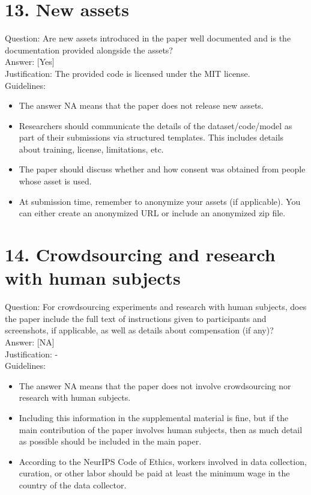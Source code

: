 \documentclass[10pt]{article}
\begin{document}
\section*{13. New assets}
Question: Are new assets introduced in the paper well documented and is the documentation provided alongside the assets?\\[0pt]
Answer: [Yes]\\
Justification: The provided code is licensed under the MIT license.\\
Guidelines:

\begin{itemize}
  \item The answer NA means that the paper does not release new assets.
  \item Researchers should communicate the details of the dataset/code/model as part of their submissions via structured templates. This includes details about training, license, limitations, etc.
  \item The paper should discuss whether and how consent was obtained from people whose asset is used.
  \item At submission time, remember to anonymize your assets (if applicable). You can either create an anonymized URL or include an anonymized zip file.
\end{itemize}

\section*{14. Crowdsourcing and research with human subjects}
Question: For crowdsourcing experiments and research with human subjects, does the paper include the full text of instructions given to participants and screenshots, if applicable, as well as details about compensation (if any)?\\[0pt]
Answer: [NA]\\
Justification: -\\
Guidelines:

\begin{itemize}
  \item The answer NA means that the paper does not involve crowdsourcing nor research with human subjects.
  \item Including this information in the supplemental material is fine, but if the main contribution of the paper involves human subjects, then as much detail as possible should be included in the main paper.
  \item According to the NeurIPS Code of Ethics, workers involved in data collection, curation, or other labor should be paid at least the minimum wage in the country of the data collector.
\end{itemize}
\end{document}
